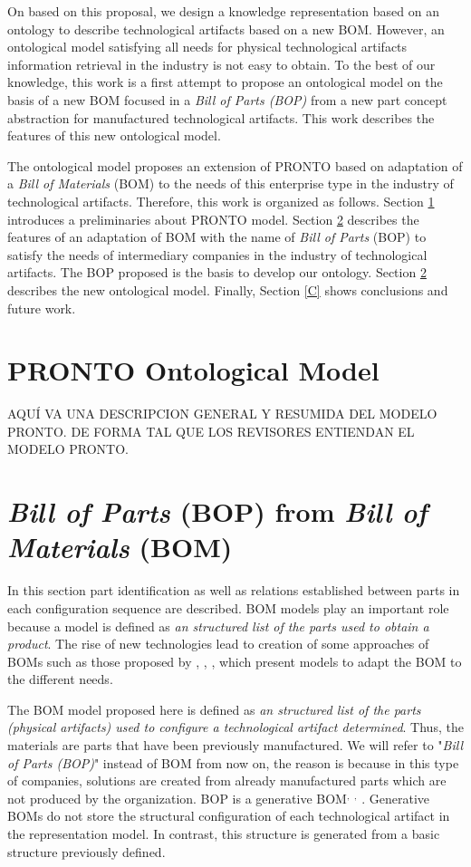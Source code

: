 \documentclass[runningheads,a4paper]{llncs}
\begin{document}
On based on this proposal, we design a knowledge representation based on an ontology to describe technological artifacts based on a new BOM. However, an ontological model satisfying all needs for physical technological artifacts information retrieval in the industry is not easy to obtain. To the best of our knowledge, this work is a first attempt to propose an ontological model on the basis of a new BOM focused in a \emph{Bill of Parts (BOP)} from a new part concept abstraction for manufactured technological artifacts. This work describes the features of this new ontological model.

The ontological model proposes an extension of PRONTO based on adaptation of a \emph{Bill of Materials} (BOM) to the needs of this enterprise type in the industry of technological artifacts. Therefore, this work is organized as follows. Section \ref{PRONTO} introduces a preliminaries about PRONTO model. Section \ref{BOP} describes the features of an adaptation of BOM with the name of \emph{Bill of Parts} (BOP) to satisfy the needs of intermediary companies in the industry of technological artifacts. The BOP proposed is the basis to develop our ontology. Section \ref{BOP} describes the new ontological model. Finally, Section \ref{C} shows conclusions and future work.

\section{PRONTO Ontological Model} \label{PRONTO}
AQUÍ VA UNA DESCRIPCION GENERAL Y RESUMIDA DEL MODELO PRONTO. DE FORMA TAL QUE LOS REVISORES ENTIENDAN EL MODELO PRONTO.

\section{\emph{Bill of Parts} (BOP) from \emph{Bill of Materials} (BOM)} \label{BOP}

In this section part identification as well as relations established between parts in each configuration sequence are described. BOM models play an important role because a model is defined as \emph{an structured list of the parts used to obtain a product}\cite{levy1986bill}. The rise of new technologies lead to creation of some approaches of BOMs such as those proposed by \cite{hegge1991generic}, \cite{willis1996method}, \cite{stonebraker1996restructuring}, which present models to adapt the BOM to the different needs. 

The BOM model proposed here is defined as \emph{an structured list of the parts (physical artifacts) used to configure a technological artifact determined}. Thus, the materials are parts that have been previously manufactured. We will refer to "\emph{Bill of Parts (BOP)}" instead of BOM from now on, the reason is because in this type of companies, solutions are created from already manufactured parts which are not produced by the organization. BOP is a generative BOM\cite{hegge1991generic}$^,$ \cite{willis1996method}$^,$ \cite{stonebraker1996restructuring}. Generative BOMs do not store the structural configuration of each technological artifact in the representation model. In contrast, this structure is generated from a basic structure previously defined.
\end{document}
